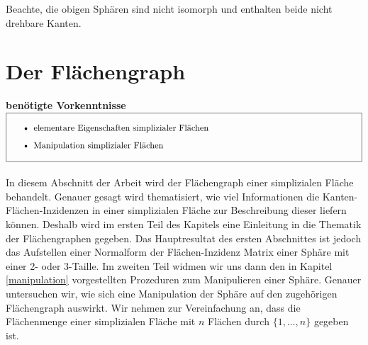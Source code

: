 \documentclass[12pt,titlepage,twoside,cleardoublepage]{article}
\theoremstyle{nummermitklammern}
\numberwithin{equation}{section}
\begin{document}
Beachte, die obigen Sphären sind nicht isomorph und enthalten beide nicht drehbare Kanten.

\section{Der Flächengraph}
\textbf{benötigte Vorkenntnisse}\\
$\fbox{
\parbox{14cm}{\begin{itemize} 
\item elementare Eigenschaften simplizialer Fl\"achen
\item Manipulation simplizialer Fl\"achen
\end{itemize}
}}$\\\\
In diesem Abschnitt der Arbeit wird der Flächengraph einer simplizialen Fläche behandelt. Genauer gesagt wird thematisiert, wie viel Informationen die Kanten-Flächen-Inzidenzen in einer simplizialen Fläche zur Beschreibung dieser liefern können. Deshalb wird im ersten Teil des Kapitels eine Einleitung in die Thematik der Flächengraphen gegeben. Das Hauptresultat des ersten Abschnittes ist jedoch das Aufstellen einer Normalform der Flächen-Inzidenz Matrix einer Sphäre mit einer 2- oder 3-Taille. Im zweiten Teil widmen wir uns dann den in Kapitel \ref{manipulation} vorgestellten Prozeduren zum Manipulieren einer Sphäre. Genauer untersuchen wir, wie sich eine Manipulation der Sphäre auf den zugehörigen Flächengraph auswirkt.  
Wir nehmen zur Vereinfachung an, dass die Flächenmenge einer simplizialen Fläche mit $n$ Flächen  durch $\{1,\ldots,n\}$ gegeben ist.
\end{document}
